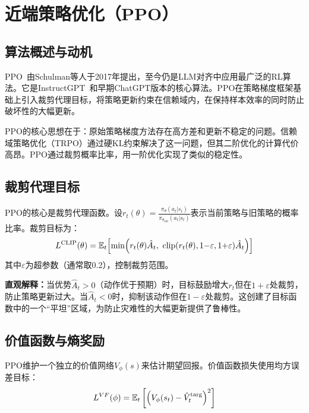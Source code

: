 \section{近端策略优化（PPO）}
\label{sec:ppo}

\subsection{算法概述与动机}

PPO~\cite{schulman2017ppo}由Schulman等人于2017年提出，至今仍是LLM对齐中应用最广泛的RL算法。它是InstructGPT~\cite{ouyang2022instructgpt}和早期ChatGPT版本的核心算法。PPO在策略梯度框架基础上引入裁剪代理目标，将策略更新约束在信赖域内，在保持样本效率的同时防止破坏性的大幅更新。

PPO的核心思想在于：原始策略梯度方法存在高方差和更新不稳定的问题。信赖域策略优化（TRPO）通过硬KL约束解决了这一问题，但其二阶优化的计算代价高昂。PPO通过裁剪概率比率，用一阶优化实现了类似的稳定性。

\subsection{裁剪代理目标}

PPO的核心是裁剪代理函数。设$r_t(\theta) = \frac{\pi_\theta(a_t|s_t)}{\pi_{\theta_{\text{old}}}(a_t|s_t)}$表示当前策略与旧策略的概率比率。裁剪目标为：
\begin{equation}
L^{\text{CLIP}}(\theta) = \mathbb{E}_t\!\left[\min\!\left(r_t(\theta)\hat{A}_t,\ \text{clip}(r_t(\theta), 1{-}\varepsilon, 1{+}\varepsilon)\hat{A}_t\right)\right]
\label{eq:ppo_clip}
\end{equation}
其中$\varepsilon$为超参数（通常取0.2），控制裁剪范围。

\textbf{直观解释：}当优势$\hat{A}_t > 0$（动作优于预期）时，目标鼓励增大$r_t$但在$1 + \varepsilon$处裁剪，防止策略更新过大。当$\hat{A}_t < 0$时，抑制该动作但在$1 - \varepsilon$处裁剪。这创建了目标函数中的一个``平坦''区域，为防止灾难性的大幅更新提供了鲁棒性。

\subsection{价值函数与熵奖励}

PPO维护一个独立的价值网络$V_\phi(s)$来估计期望回报。价值函数损失使用均方误差目标：
\begin{equation}
L^{VF}(\phi) = \mathbb{E}_t\left[\left(V_\phi(s_t) - \hat{V}_t^{\text{targ}}\right)^2\right]
\end{equation}


